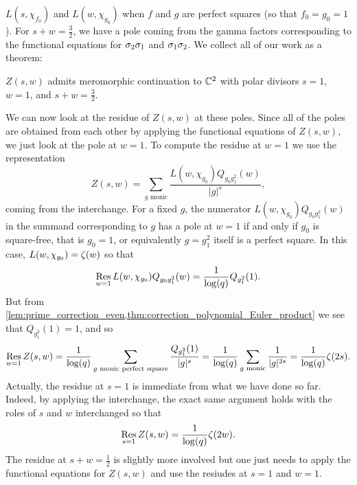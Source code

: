 \documentclass[12pt,reqno,oneside]{amsart}
\begin{document}
$L(s,\chi_{f_{0}})$ and $L(w,\chi_{g_{0}})$ when $f$ and $g$ are perfect squares (so that $f_{0} = g_{0} = 1$). For $s+w = \frac{3}{2}$, we have a pole coming from the gamma factors corresponding to the functional equations for $\sigma_{2}\sigma_{1}$ and $\sigma_{1}\sigma_{2}$. We collect all of our work as a theorem:

    \begin{theorem}
        $Z(s,w)$ admits meromorphic continuation to $\mathbb{C}^{2}$ with polar divisors $s = 1$, $w = 1$, and $s+w = \frac{3}{2}$.
    \end{theorem}

    We can now look at the residue of $Z(s,w)$ at these poles. Since all of the poles are obtained from each other by applying the functional equations of $Z(s,w)$, we just look at the pole at $w = 1$. To compute the residue at $w = 1$ we use the representation
    \[
        Z(s,w) = \sum_{\text{$g$ monic}}\frac{L(w,\chi_{g_{0}})Q_{g_{0}g_{1}^{2}}(w)}{|g|^{s}},
    \]
    coming from the interchange. For a fixed $g$, the numerator $L(w,\chi_{g_{0}})Q_{g_{0}g_{1}^{2}}(w)$ in the summand corresponding to $g$ has a pole at $w = 1$ if and only if $g_{0}$ is square-free, that is $g_{0} = 1$, or equivalently $g = g_{1}^{2}$ itself is a perfect square. In this case, $L(w,\chi_{g_{0}}) = \zeta(w)$ so that
    \[
        \operatorname*{\mathrm{Res}}_{w = 1}L(w,\chi_{g_{0}})Q_{g_{0}g_{1}^{2}}(w) = \frac{1}{\log(q)}Q_{g_{1}^{2}}(1).
    \]
    But from \cref{lem:prime_correction_even,thm:correction_polynomial_Euler_product} we see that $Q_{g_{1}^{2}}(1) = 1$, and so
    \[
        \operatorname*{\mathrm{Res}}_{w = 1}Z(s,w) = \frac{1}{\log(q)}\sum_{\text{$g$ monic perfect square}}\frac{Q_{g_{1}^{2}}(1)}{|g|^{s}} = \frac{1}{\log(q)}\sum_{\text{$g$ monic}}\frac{1}{|g|^{2s}} = \frac{1}{\log(q)}\zeta(2s).
    \]
    Actually, the residue at $s = 1$ is immediate from what we have done so far. Indeed, by applying the interchange, the exact same argument holds with the roles of $s$ and $w$ interchanged so that
    \[
        \operatorname*{\mathrm{Res}}_{s = 1}Z(s,w) = \frac{1}{\log(q)}\zeta(2w).
    \]
    The residue at $s+w = \frac{1}{2}$ is slightly more involved but one just needs to apply the functional equations for $Z(s,w)$ and use the resiudes at $s = 1$ and $w = 1$.
\end{document}
